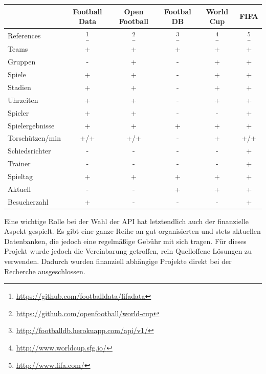 \documentclass[runningheads,a4paper]{llncs}
\begin{document}
\begin{center}
\begin{savenotes}
\begin{tabular}{|l|c|c|c|c|c|}   \hline 
 & Football Data 	& Open Football 	& Footbal DB  &	World Cup  & FIFA  \\ \hline
References & \footnote{\url{https://github.com/footballdata/fifadata}} & \footnote{\url{https://github.com/openfootball/world-cup}
} &  \footnote{\url{http://footballdb.herokuapp.com/api/v1/}} &
 \footnote{\url{http://www.worldcup.sfg.io/}} & \footnote{\url{http://www.fifa.com/}} \\ \hline
 
Teams				& + & + & +	& + & +		\\ \hline
Gruppen				& - & + & -	& + & +		\\ \hline
Spiele				& + & + & -	& + & +		\\ \hline
Stadien				& + & + & -	& + & +		\\ \hline
Uhrzeiten			& + & + & -	& + & +		\\ \hline
Spieler				& + & + & - & - & +		\\ \hline
Spielergebnisse		& + & + & + & + & + 		\\ \hline
Torschützen/min		& +/+ & 	+/+ & - & + & +/+ 	\\ \hline
Schiedsrichter		& - & - & - & - & +		\\ \hline
Trainer				& - & - & - & - & +		\\ \hline
Spieltag 			& + & + & + & + & +		\\ \hline
Aktuell				& - & - & + & + & +  \\ \hline
Besucherzahl			& + & - & - & - & +		\\ \hline
			 
\end{tabular}

\end{savenotes}


\end{center}


Eine wichtige Rolle bei der Wahl der API hat letztendlich auch der finanzielle Aspekt gespielt. Es gibt eine ganze Reihe an gut organisierten und stets aktuellen Datenbanken, die jedoch eine regelmäßige Gebühr mit sich tragen. Für dieses Projekt wurde jedoch die Vereinbarung getroffen, rein Quelloffene Lösungen zu verwenden. Dadurch wurden finanziell abhängige Projekte direkt bei der Recherche ausgeschlossen. 
  
\end{document}
